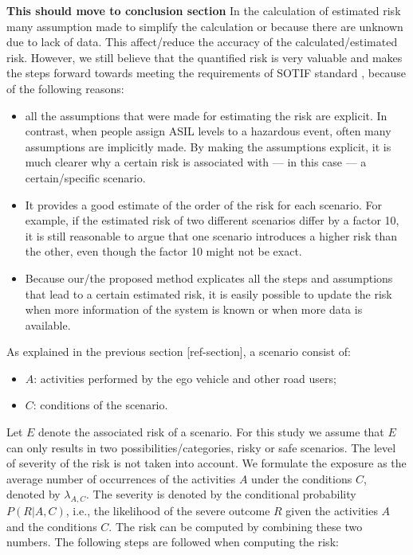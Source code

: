 \color{red}
\textbf{This should move to conclusion section}
In the calculation of estimated risk many assumption made to simplify the calculation or because there are unknown due to lack of data. This affect/reduce the accuracy of the calculated/estimated risk. 
However, we still believe that the quantified risk is very valuable and makes the steps forward towards meeting the requirements of SOTIF standard , because of the following reasons:
\begin{itemize}
	\item all the assumptions that were made for estimating the risk are explicit. In contrast, when people assign ASIL levels to a hazardous event, often many assumptions are implicitly made. By making the assumptions explicit, it is much clearer why a certain risk is associated with --- in this case --- a certain/specific scenario.
	\item It provides a good estimate of the order of the risk for each scenario. For example, if the estimated risk of two different scenarios differ by a factor 10, it is still reasonable to argue that one scenario introduces a higher risk than the other, even though the factor 10 might not be exact.
	\item Because our/the proposed method explicates all the steps and assumptions that lead to a certain estimated risk, it is easily possible to update the risk when more information of the system is known or when more data is available.
\end{itemize}
\color{black}
As explained in the previous section [ref-section], a scenario consist of:
\begin{itemize}
	\item $A$: activities performed by the ego vehicle and other road users;
	\item $C$: conditions of the scenario.
\end{itemize}
Let $E$ denote the associated risk of a scenario. For this study we assume that $E$ can only results in two possibilities/categories, risky or safe scenarios. The level of severity of the risk is not taken into account. We formulate the exposure as the average number of occurrences of the activities $A$ under the conditions $C$, denoted by $\lambda_{A,C}$. The severity is denoted by the conditional probability $P(R|A,C)$, i.e., the likelihood of the severe outcome $R$ given the activities $A$ and the conditions $C$. The risk can be computed by combining these two numbers. The following steps are followed when computing the risk:
